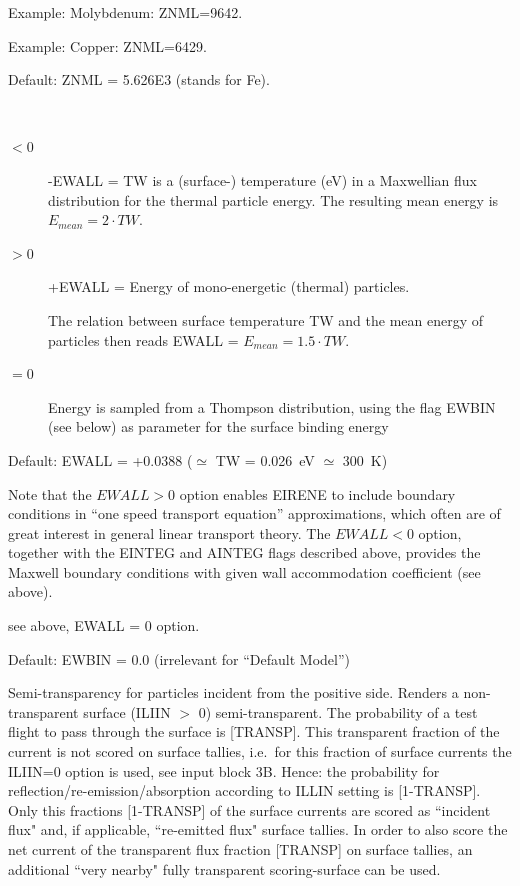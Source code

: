 \begin{description}
        Example: Molybdenum: ZNML=9642.

        Example: Copper: ZNML=6429.

        Default: ZNML = 5.626E3 (stands for Fe).
  \item[EWALL] ~
        \begin{description}
          \item[$< 0$] -EWALL = TW is a (surface-)
                temperature (\si{\electronvolt}) in a Maxwellian flux distribution for the
                thermal particle energy.
                The resulting mean energy is $E_{mean} = 2 \cdot TW$.
          \item[$> 0$] +EWALL = Energy of mono-energetic (thermal) particles.

                The relation between surface temperature TW and the mean energy of particles
                then reads EWALL = $E_{mean} = 1.5 \cdot TW$.
          \item[$= 0$] Energy is sampled from a Thompson distribution, using the flag
                EWBIN (see below) as parameter for the surface binding energy
        \end{description}

        Default: EWALL = +0.0388 ($\simeq$ TW = \SI{0.026}{\electronvolt} $\simeq$
        \SI{300}{\kelvin}) 

        Note that the $EWALL > 0 $ option enables EIRENE to include boundary conditions
        in ``one speed transport equation'' approximations, which often are of great
        interest in general linear transport theory.
        The $EWALL < 0 $ option, together with the EINTEG and AINTEG flags described
        above, provides the Maxwell boundary conditions with given wall accommodation
        coefficient (see above).
  \item[EWBIN] see above, EWALL = 0 option.

        Default: EWBIN = 0.0 (irrelevant for ``Default Model'') 

  \item[TRANSP(1)] Semi-transparency for particles incident from the positive
        side.
        Renders a non-transparent surface (ILIIN $>$ 0) semi-transparent.
        The probability of a test flight to pass through the surface is [TRANSP].
        This transparent fraction of the current is not scored on surface tallies,
        i.e.\ for this fraction of surface currents the ILIIN=0 option is used, see
        input block 3B.
        Hence:
        the probability for reflection/re-emission/absorption according to
        ILLIN setting is [1-TRANSP].
        Only this fractions [1-TRANSP] of the surface currents are scored as ``incident
        flux" and, if applicable, ``re-emitted flux" surface tallies.
        In order to also score the net current of the transparent flux fraction
          [TRANSP] on surface tallies, an additional ``very nearby" fully transparent
        scoring-surface can be used.


\end{description}
